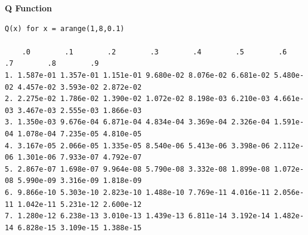\documentclass[12pt]{article}
\begin{document}
\vfill
\eject

\begin{large}
\textbf{Q Function}
\end{large}
\medskip
\bigskip

\begin{scriptsize}
\begin{verbatim}
Q(x) for x = arange(1,8,0.1)

    .0        .1        .2        .3        .4        .5        .6        .7        .8        .9
1. 1.587e-01 1.357e-01 1.151e-01 9.680e-02 8.076e-02 6.681e-02 5.480e-02 4.457e-02 3.593e-02 2.872e-02
2. 2.275e-02 1.786e-02 1.390e-02 1.072e-02 8.198e-03 6.210e-03 4.661e-03 3.467e-03 2.555e-03 1.866e-03
3. 1.350e-03 9.676e-04 6.871e-04 4.834e-04 3.369e-04 2.326e-04 1.591e-04 1.078e-04 7.235e-05 4.810e-05
4. 3.167e-05 2.066e-05 1.335e-05 8.540e-06 5.413e-06 3.398e-06 2.112e-06 1.301e-06 7.933e-07 4.792e-07
5. 2.867e-07 1.698e-07 9.964e-08 5.790e-08 3.332e-08 1.899e-08 1.072e-08 5.990e-09 3.316e-09 1.818e-09
6. 9.866e-10 5.303e-10 2.823e-10 1.488e-10 7.769e-11 4.016e-11 2.056e-11 1.042e-11 5.231e-12 2.600e-12
7. 1.280e-12 6.238e-13 3.010e-13 1.439e-13 6.811e-14 3.192e-14 1.482e-14 6.828e-15 3.109e-15 1.388e-15
\end{verbatim}
\end{scriptsize}
\end{document}
